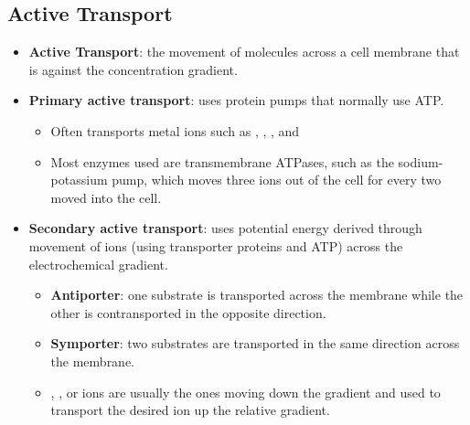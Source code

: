 \documentclass[12pt,a4paper]{article}
\begin{document}
\subsection{Active Transport}
\begin{itemize}
    \item \textbf{Active Transport}: the movement of molecules across a cell membrane that is {\color{o-Sun}against} the concentration gradient.
    \item \textbf{Primary active transport}: uses protein pumps that normally use ATP.
        \begin{itemize}
            \item Often transports metal ions such as {\color{pos}}, {\color{pos}}, {\color{pos}}, and {\color{pos}}
            \item Most enzymes used are transmembrane ATPases, such as the sodium-potassium pump, which moves three {\color{pos}} ions out of the cell for every two {\color{pos}} moved into the cell.
        \end{itemize}
    \item \textbf{Secondary active transport}: uses potential energy derived through movement of ions (using transporter proteins and ATP) across the electrochemical gradient.
        \begin{itemize}
            \item \textbf{Antiporter}: one substrate is transported across the membrane while the other is contransported in the opposite direction.
            \item \textbf{Symporter}: two substrates are transported in the same direction across the membrane.
            \item {\color{pos}}, {\color{pos}}, or {\color{pos}} ions are usually the ones moving down the gradient and used to transport the desired ion up the relative gradient. 
        \end{itemize}
\end{itemize}
\end{document}

